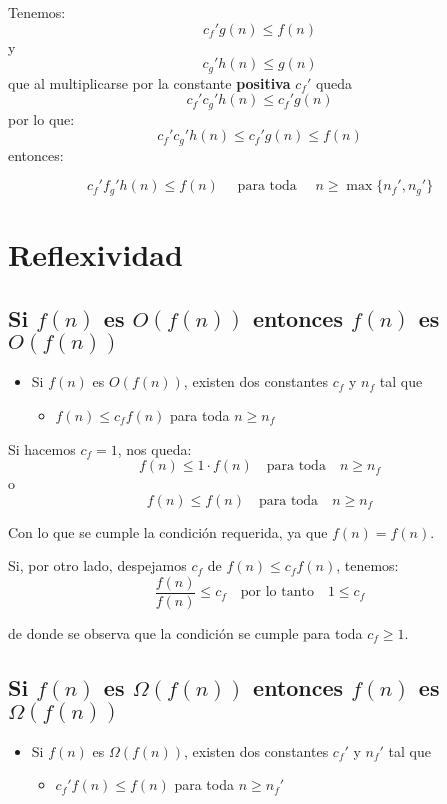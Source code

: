 \documentclass[letterpaper, 12pt]{article}
\begin{document}
Tenemos:
$$
c_f' g(n) \leq f(n)
$$
y
$$
c_g' h(n) \leq g(n)
$$
que al multiplicarse por la constante \textbf{positiva} \(c_f'\) queda
$$
c_f' c_g' h(n) \leq c_f' g(n)
$$
por lo que:
$$
c_f' c_g' h(n) \leq c_f' g(n) \leq f(n)
$$
entonces:

$$
c_f' f_g' h(n) \leq f(n) \quad \mbox{ para toda } \quad n \geq \max\{n_f', n_g'\}
$$
\section{Reflexividad}
\label{sec:orgcf4c494}
\subsection{Si \(f(n)\) es \(O(f(n))\) entonces \(f(n)\) es \(O(f(n))\)}
\label{sec:org57fdc4b}
\begin{itemize}
\item Si \(f(n)\) es \(O(f(n))\), existen dos constantes \(c_f\) y \(n_f\) tal que
\begin{itemize}
\item \(f(n) \leq c_f f(n)\) para toda \(n \geq n_f\)
\end{itemize}
\end{itemize}

\noindent
Si hacemos \(c_f = 1\), nos queda:
$$
f(n) \leq 1 \cdot f(n) \quad \mbox{para toda} \quad n \geq n_f
$$
o
$$
f(n) \leq f(n) \quad \mbox{para toda} \quad n \geq n_f
$$


\noindent
Con lo que se cumple la condición requerida, ya que \(f(n) = f(n)\).


\noindent
Si, por otro lado, despejamos \(c_f\) de \(f(n) \leq c_f f(n)\), tenemos:
\begin{equation*}
\frac{f(n)}{f(n)} \leq c_f \quad \mbox{por lo tanto} \quad 1 \leq c_f
\end{equation*}

de donde se observa que la condición se cumple para toda \(c_f \geq 1\).
\subsection{Si \(f(n)\) es \(\Omega(f(n))\) entonces \(f(n)\) es \(\Omega(f(n))\)}
\label{sec:org9cb5b2e}
\begin{itemize}
\item Si \(f(n)\) es \(\Omega(f(n))\), existen dos constantes \(c_f'\) y \(n_f'\) tal que
\begin{itemize}
\item \(c_f' f(n) \leq f(n)\) para toda \(n \geq n_f'\)
\end{itemize}
\end{itemize}
\end{document}

